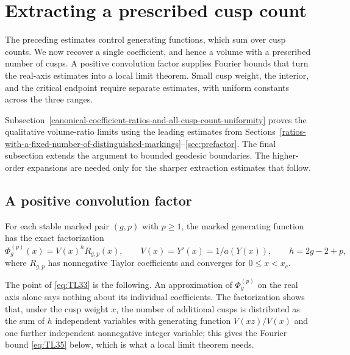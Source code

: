 \section{Extracting a prescribed cusp count}\label{extracting-fixed-cusp-counts}

The preceding estimates control generating functions, which sum over cusp counts. We now recover a single coefficient, and hence a volume with a prescribed number of cusps. A positive convolution factor supplies Fourier bounds that turn the real-axis estimates into a local limit theorem. Small cusp weight, the interior, and the critical endpoint require separate estimates, with uniform constants across the three ranges.

Subsection~\ref{canonical-coefficient-ratios-and-all-cusp-count-uniformity} proves the qualitative volume-ratio limits using the leading estimates from Sections~\ref{ratios-with-a-fixed-number-of-distinguished-markings}--\ref{sec:prefactor}. The final subsection extends the argument to bounded geodesic boundaries. The higher-order expansions are needed only for the sharper extraction estimates that follow.

\subsection{A positive convolution factor}\label{a-positive-convolution-factor}

\begin{lemma}\label{lem:convolution}
For each stable marked pair \((g,p)\) with \(p\ge1\), the marked generating
function has the exact factorization
\begin{equation}
\Phi_g^{(p)}(x)=V(x)^h R_{g,p}(x),\qquad
 V(x)=Y'(x)=1/a(Y(x)),\qquad h=2g-2+p,
 \label{eq:TL33}
\end{equation} where \(R_{g,p}\) has nonnegative Taylor coefficients and
converges for \(0\le x<x_c\).
\end{lemma}

The point of \eqref{eq:TL33} is the following. An approximation of \(\Phi_g^{(p)}\) on
the real axis alone says nothing about its individual coefficients. The
factorization shows that, under the cusp weight \(x\), the number of
additional cusps is distributed as the sum of \(h\) independent variables
with generating function \(V(xz)/V(x)\) and one further independent
nonnegative integer variable; this gives the Fourier bound \eqref{eq:TL35} below, which is what
a local limit theorem needs.

